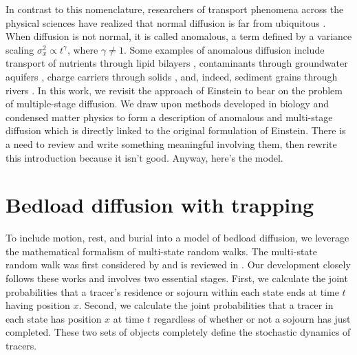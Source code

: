 \documentclass[]{agujournal2018}
\begin{document}
In contrast to this nomenclature, researchers of transport phenomena across the physical sciences have realized that normal diffusion is far from ubiquitous \citep{Shlesinger1993}.
When diffusion is not normal, it is called anomalous, a term defined by a variance scaling $\sigma_x^2 \propto t^\gamma$, where $\gamma \neq 1$. 
Some examples of anomalous diffusion include transport of nutrients through lipid bilayers \citep[e.g.][]{Jeon2012,Molina-Garcia2018}, contaminants through groundwater aquifers \citep[e.g.][]{AaraoReis2014,Yang2019}, charge carriers through solids \citep[e.g.][]{Scher1973}, and, indeed, sediment grains through rivers \citep{Hassan2017,Phillips2013,Martin2012,Bradley2017}.
In this work, we revisit the approach of Einstein to bear on the problem of multiple-stage diffusion.
We draw upon methods developed in biology and condensed matter physics to form a description of anomalous and multi-stage diffusion which is directly linked to the original formulation of Einstein.
There is a need to review \citet{Wu2019, Zhang2012, Hassan2017, Phillips2013, Martin2012} and write something meaningful involving them, then rewrite this introduction because it isn't good.
Anyway, here's the model.


\section{Bedload diffusion with trapping}
To include motion, rest, and burial into a model of bedload diffusion, we leverage the mathematical formalism of multi-state random walks.
The multi-state random walk was first considered by \citet{Weiss1976} and is reviewed in \citet{Weiss1994}. Our development closely follows these works and involves two essential stages.
First, we calculate the joint probabilities that a tracer's residence or sojourn within each state ends at time $t$ having position $x$.
Second, we calculate the joint probabilities that a tracer in each state has position $x$ at time $t$ regardless of whether or not a sojourn has just completed.
These two sets of objects completely define the stochastic dynamics of tracers.
\end{document}
